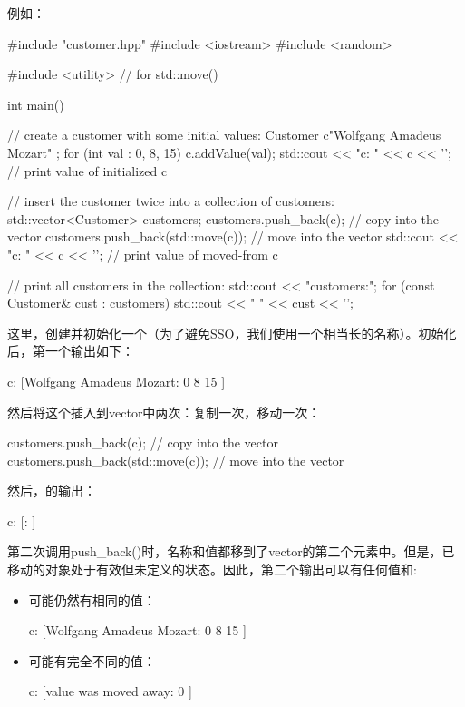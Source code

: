 例如：

\begin{cppcode}
#include "customer.hpp"
#include <iostream>
#include <random>

#include <utility> // for std::move()

int main()
{
	// create a customer with some initial values:
	Customer c{"Wolfgang Amadeus Mozart" };
	for (int val : {0, 8, 15}) {
		c.addValue(val);
	}
	std::cout << "c: " << c << '\n'; // print value of initialized c

	// insert the customer twice into a collection of customers:
	std::vector<Customer> customers;
	customers.push_back(c); // copy into the vector
	customers.push_back(std::move(c)); // move into the vector
	std::cout << "c: " << c << '\n'; // print value of moved-from c

	// print all customers in the collection:
	std::cout << "customers:\n";
	for (const Customer& cust : customers) {
		std::cout << " " << cust << '\n';
	}
}
\end{cppcode}

这里，创建并初始化一个（为了避免SSO，我们使用一个相当长的名称）。初始化后，第一个输出如下：

\begin{outputcode}
c: [Wolfgang Amadeus Mozart: 0 8 15 ]
\end{outputcode}

然后将这个插入到vector中两次：复制一次，移动一次：

\begin{cppcode}
customers.push_back(c); // copy into the vector
customers.push_back(std::move(c)); // move into the vector
\end{cppcode}

然后，的输出：

\begin{outputcode}
c: [: ]
\end{outputcode}

第二次调用push_back()时，名称和值都移到了vector的第二个元素中。但是，已移动的对象处于有效但未定义的状态。因此，第二个输出可以有任何值和:

\begin{itemize}
	\item 可能仍然有相同的值：

	\begin{outputcode}
c: [Wolfgang Amadeus Mozart: 0 8 15 ]
	\end{outputcode}
	\item 可能有完全不同的值：

	\begin{outputcode}
c: [value was moved away: 0 ]
	\end{outputcode}
\end{itemize}

